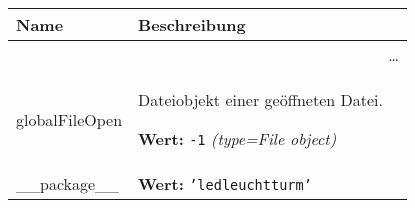     \vspace{-1cm}
\hspace{\varindent}\begin{longtable}{|p{\varnamewidth}|p{\vardescrwidth}|l}
\cline{1-2}
\cline{1-2} \centering \textbf{Name} & \centering \textbf{Beschreibung}& \\
\cline{1-2}
\endhead\cline{1-2}\multicolumn{3}{r}{\small\ldots}\\\endfoot\cline{1-2}
\endlastfoot\raggedright g\-l\-o\-b\-a\-l\-F\-i\-l\-e\-O\-p\-e\-n\- & \raggedright Dateiobjekt einer geöffneten Datei.

\textbf{Wert:} 
{\tt -1}            {\it (type=File object)}&\\
\cline{1-2}
\raggedright \_\-\_\-p\-a\-c\-k\-a\-g\-e\-\_\-\_\- & \raggedright \textbf{Wert:} 
{\tt \texttt{'}\texttt{ledleuchtturm}\texttt{'}}&\\
\cline{1-2}
\end{longtable}

